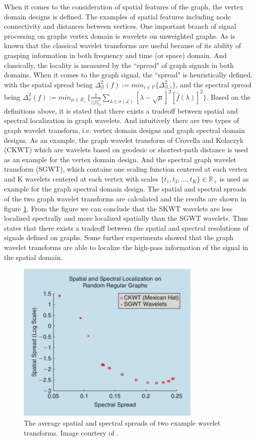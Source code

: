 \documentclass[conference]{IEEEtran}
\begin{document}
When it comes to the consideration of spatial features of the graph, the vertex domain designs is defined. The examples of spatial features including node connectivity and distances between vertices. One important branch of signal processing on graphs vertex domain is wavelets on unweighted graphs. As is known that the classical wavelet transforms are useful because of its ability of grasping information in both frequency and time (or space) domain. And classically, the locality is measured by the ``spread" of graph signals in both domains. When it comes to the graph signal, the ``spread" is heuristically defined, with the spatial spread being $\Delta_\mathcal{G}^2(f):=min_{i\in\mathcal{V}}\{\Delta_{\mathcal{G}, i}^2\}$, and the spectral spread being $\Delta_{\sigma}^2(f):=min_{\mu\in R_+}\{\displaystyle\frac{1}{||f||_2^2}\sum_{\lambda\in\sigma (\mathcal{L})}[\lambda-\sqrt{\mu}]^2[\hat{f}(\lambda)]^2\}$. Based on the definitions above, it is stated that there exists a tradeoff between spatial and spectral localization in graph wavelets. And intuitively there are two types of graph wavelet transform, i.e. vertex domain designs and graph spectral domain designs. As an example, the graph wavelet transform of Crovella and Kolaczyk (CKWT) which are wavelets based on geodesic or shortest-path distance is used as an example for the vertex domain design. And the spectral graph wavelet transform (SGWT), which contains one scaling function centered at each vertex and K wavelets centered at each vertex with scales $\{t_1, t_2, ..., t_K\}\in \mathbb{R}_+$ is used as example for the graph spectral domain design. The spatial and spectral spreads of the two graph wavelet transforms are calculated and the results are shown in figure \ref{4}. From the figure we can conclude that the SKWT wavelets are less localized spectrally and more localized spatially than the SGWT wavelets. Thus states that there exists a tradeoff between the spatial and spectral resolutions of signals defined on graphs. Some further experiments showed that the graph wavelet transforms are able to localize the high-pass information of the signal in the spatial domain.\\
\begin{figure}[htbp]
\centerline{\includegraphics[width=3.5in]{4.png}}
\caption{The average spatial and spectral spreads of two example wavelet transforms. Image courtesy of \cite{b1}.}
\label{4}
\end{figure}
\end{document}
